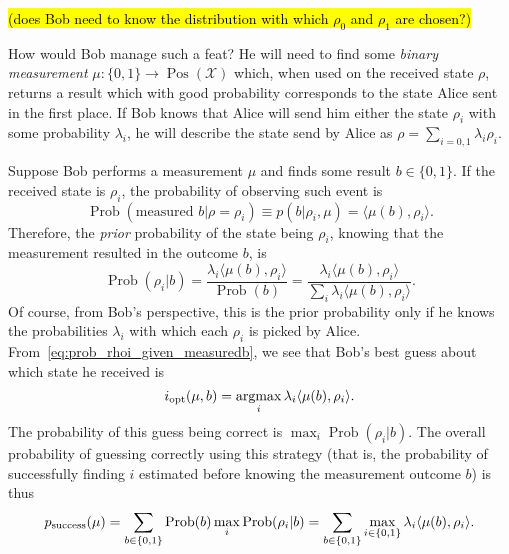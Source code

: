 \documentclass[12pt]{report}
\newcommand{\calX}{{\mathcal{X}}}
\DeclareMathOperator{\Pos}{Pos}
\DeclareMathOperator{\Prob}{Prob}
\DeclareMathOperator*{\argmax}{argmax}
\begin{document}
\hl{(does Bob need to know the distribution with which $\rho_0$ and $\rho_1$ are chosen?)}

How would Bob manage such a feat? He will need to find some \emph{binary measurement} $\mu:\{0,1\}\to\Pos(\calX)$ which, when used on the received state $\rho$, returns a result which with good probability corresponds to the state Alice sent in the first place.
If Bob knows that Alice will send him either the state $\rho_i$ with some probability $\lambda_i$, he will describe the state send by Alice as
$\rho = \sum_{i=0,1} \lambda_i \rho_i$.

Suppose Bob performs a measurement $\mu$ and finds some result $b\in\{0,1\}$.
If the received state is $\rho_i$, the probability of observing such event is
\begin{equation}
	\Prob(\text{measured }b | \rho=\rho_i)
	\equiv p(b | \rho_i,\mu)
	= \langle \mu(b), \rho_i\rangle.
\end{equation}
Therefore, the \emph{prior} probability of the state being $\rho_i$, knowing that the measurement resulted in the outcome $b$, is
\begin{equation}
	\Prob(\rho_i | b)
	= \frac{\lambda_i \langle \mu(b),\rho_i\rangle}{\Prob(b)}
	= \frac{\lambda_i \langle \mu(b),\rho_i\rangle}{\sum_i \lambda_i \langle \mu(b),\rho_i\rangle}.
	\label{eq:prob_rhoi_given_measuredb}
\end{equation}
Of course, from Bob's perspective, this is the prior probability only if he knows the probabilities $\lambda_i$ with which each $\rho_i$ is picked by Alice.
From~\cref{eq:prob_rhoi_given_measuredb}, we see that Bob's best guess about which state he received is
\begin{equation}
	i_{\rm opt}(\mu,b) = \argmax_i \lambda_i \langle\mu(b),\rho_i\rangle.
\end{equation}
The probability of this guess being correct is
$\max_i\Prob(\rho_i|b)$.
The overall probability of guessing correctly using this strategy (that is, the probability of successfully finding $i$ estimated before knowing the measurement outcome $b$) is thus
\begin{equation}
	p_{\rm success}(\mu)
	= \sum_{b\in\{0,1\}}
	\Prob(b)
	\max_i \Prob(\rho_i | b)
	= \sum_{b\in\{0,1\}}
	\max_{i\in\{0,1\}}
	\lambda_i \langle\mu(b),\rho_i\rangle.
\end{equation}
\end{document}
